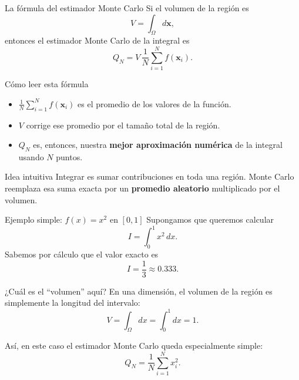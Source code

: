 \begin{frame}{La fórmula del estimador Monte Carlo}
\justifying
Si el volumen de la región es
\begin{equation*}
V = \int_{\Omega} d\bm{x},
\end{equation*}
entonces el estimador Monte Carlo de la integral es
\begin{equation*}
Q_N = V\,\frac{1}{N}\sum_{i=1}^N f(\bm{x}_i).
\end{equation*}
\begin{block}{Cómo leer esta fórmula}
\begin{itemize}
    \item $\frac{1}{N}\sum_{i=1}^N f(\bm{x}_i)$ es el promedio de los valores de la función.
    \item $V$ corrige ese promedio por el tamaño total de la región.
    \item $Q_N$ es, entonces, nuestra \textbf{mejor aproximación numérica} de la integral usando $N$ puntos.
\end{itemize}
\end{block}

\begin{alertblock}{Idea intuitiva}
Integrar es sumar contribuciones en toda una región. Monte Carlo reemplaza esa
suma exacta por un \textbf{promedio aleatorio} multiplicado por el volumen.
\end{alertblock}
\end{frame}

\begin{frame}{Ejemplo simple: $f(x)=x^2$ en $[0,1]$}
\justifying
Supongamos que queremos calcular
\begin{equation*}
I=\int_0^1 x^2\,dx.
\end{equation*}
Sabemos por cálculo que el valor exacto es
\begin{equation*}
I=\frac{1}{3}\approx 0.333.
\end{equation*}

\begin{block}{¿Cuál es el ``volumen'' aquí?}
En una dimensión, el volumen de la región es simplemente la longitud del
intervalo:
\begin{equation*}
V=\int_\Omega dx=\int_0^1 dx=1.
\end{equation*}
\end{block}

Así, en este caso el estimador Monte Carlo queda especialmente simple:
\begin{equation*}
Q_N = \frac{1}{N}\sum_{i=1}^N x_i^2.
\end{equation*}
\end{frame}

